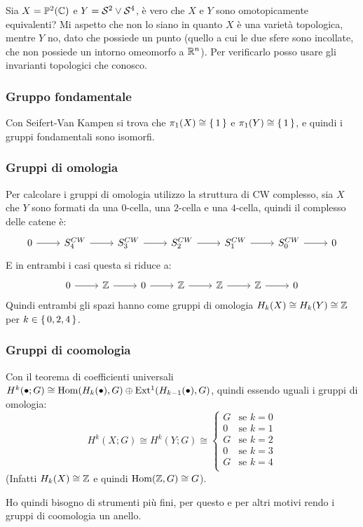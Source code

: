 \begin{example}
  Sia $ X = \mathbb{P}^2 (\mathbb{C}) $ e $ Y = \mathcal{S}^{2} \vee \mathcal{S}^{4} $, è vero che $ X $ e $ Y $ sono
  omotopicamente equivalenti? Mi aspetto che non lo siano in quanto $ X $ è una
  varietà topologica, mentre $ Y $ no, dato che possiede un punto (quello a cui
  le due sfere sono incollate, che non possiede un intorno omeomorfo a
  $ \mathbb{R}^{n} $). Per verificarlo posso usare gli invarianti topologici che
  conosco.
  \subsubsection{Gruppo fondamentale}
  Con Seifert-Van Kampen si trova che $ \pi_1(X) \cong \set{1} $ e
  $ \pi_1(Y) \cong \set{1} $, e quindi i gruppi fondamentali sono isomorfi.
  \subsubsection{Gruppi di omologia}
  Per calcolare i gruppi di omologia utilizzo la struttura di CW complesso,
  sia $ X $ che $ Y $ sono formati da una $ 0 $-cella, una $ 2 $-cella e una
  $ 4 $-cella, quindi il complesso delle catene è:
  \[
    \begin{tikzcd}
      0 \rar & S_4^{CW} \rar & S_3^{CW} \rar & S_2^{CW} \rar & S_1^{CW} \rar & S_0^{CW} \rar & 0
    \end{tikzcd}
  \]
  E in entrambi i casi questa si riduce a:
  \[
    \begin{tikzcd}
      0 \rar & \Z \rar & 0 \rar & \Z \rar & \Z \rar & \Z \rar & 0
    \end{tikzcd}
  \]
  Quindi entrambi gli spazi hanno come gruppi di omologia
  $ H_k(X) \cong H_k(Y) \cong \mathbb{Z} $ per $ k \in \set{0,2,4} $.
  \subsubsection{Gruppi di coomologia}
  Con il teorema di coefficienti universali $ H^k(\bullet;G) \cong \mathrm{Hom}( H_k(\bullet), G) \oplus \mathrm{Ext^1}( H_{k-1}(\bullet), G) $,
  quindi essendo uguali i gruppi di omologia:
  \[
    H^k(X;G) \cong H^k(Y;G) \cong
    \begin{cases}
      G & \text{se } k = 0 \\
      0 & \text{se } k = 1 \\
      G & \text{se } k = 2 \\
      0 & \text{se } k = 3 \\
      G & \text{se } k = 4 \\
    \end{cases}
  \]
  (Infatti $ H_k(X) \cong \mathbb{Z} $ e quindi $ \mathrm{Hom}( \mathbb{Z}, G) \cong G $).

  Ho quindi bisogno di strumenti più fini, per questo e per altri motivi rendo i
  gruppi di coomologia un anello.

\end{example}

